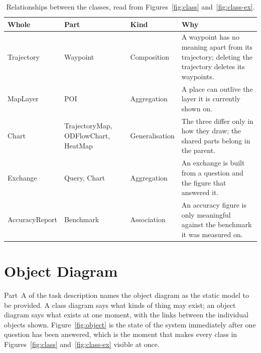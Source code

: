 \documentclass[12pt,a4paper]{report}
\begin{document}
\begin{table}[H]
  \centering
  \caption{Relationships between the classes, read from
    Figures~\ref{fig:class} and~\ref{fig:class-ex}.}
  \label{tab:relationships}
  \setlength{\tabcolsep}{4.5pt}
  \begin{tabular}{@{}>{\raggedright\arraybackslash}p{2.85cm}
                    >{\raggedright\arraybackslash}p{3.9cm}
                    >{\raggedright\arraybackslash}p{2.7cm}
                    >{\raggedright\arraybackslash}p{5.25cm}@{}}
    \toprule[1.5pt]
    \textbf{Whole} & \textbf{Part} & \textbf{Kind} & \textbf{Why} \\
    \midrule
    Trajectory & Waypoint & Composition & A waypoint has no meaning apart
      from its trajectory; deleting the trajectory deletes its waypoints. \\
    \addlinespace
    MapLayer & POI & Aggregation & A place can outlive the layer it is
      currently shown on. \\
    \addlinespace
    Chart & TrajectoryMap, ODFlowChart, HeatMap & Generalisation & The
      three differ only in how they draw; the shared parts belong in the
      parent. \\
    \addlinespace
    Exchange & Query, Chart & Aggregation & An exchange is built from a
      question and the figure that answered it. \\
    \addlinespace
    AccuracyReport & Benchmark & Association & An accuracy figure is only
      meaningful against the benchmark it was measured on. \\
    \bottomrule[1.5pt]
  \end{tabular}
\end{table}

\section{Object Diagram}
\label{sec:object-diagram}

Part~A of the task description names the object diagram as the static model
to be provided. A class diagram says what kinds of thing may exist; an
object diagram says what exists at one moment, with the links between the
individual objects shown. Figure~\ref{fig:object} is the state of the
system immediately after one question has been answered, which is the
moment that makes every class in Figures~\ref{fig:class}
and~\ref{fig:class-ex} visible at once.
\end{document}
